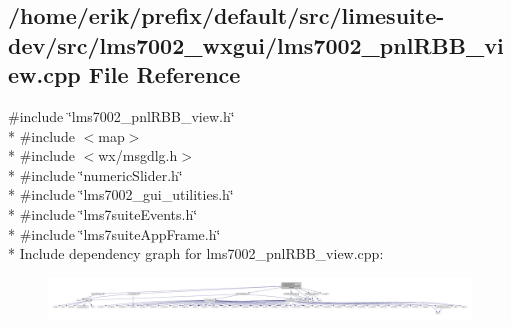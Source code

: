 \subsection{/home/erik/prefix/default/src/limesuite-\/dev/src/lms7002\+\_\+wxgui/lms7002\+\_\+pnl\+R\+B\+B\+\_\+view.cpp File Reference}
\label{lms7002__pnlRBB__view_8cpp}
{\ttfamily \#include \char`\"{}lms7002\+\_\+pnl\+R\+B\+B\+\_\+view.\+h\char`\"{}}\\*
{\ttfamily \#include $<$map$>$}\\*
{\ttfamily \#include $<$wx/msgdlg.\+h$>$}\\*
{\ttfamily \#include \char`\"{}numeric\+Slider.\+h\char`\"{}}\\*
{\ttfamily \#include \char`\"{}lms7002\+\_\+gui\+\_\+utilities.\+h\char`\"{}}\\*
{\ttfamily \#include \char`\"{}lms7suite\+Events.\+h\char`\"{}}\\*
{\ttfamily \#include \char`\"{}lms7suite\+App\+Frame.\+h\char`\"{}}\\*
Include dependency graph for lms7002\+\_\+pnl\+R\+B\+B\+\_\+view.\+cpp\+:
\nopagebreak
\begin{figure}[H]
\begin{center}
\leavevmode
\includegraphics[width=350pt]{db/db0/lms7002__pnlRBB__view_8cpp__incl}
\end{center}
\end{figure}
